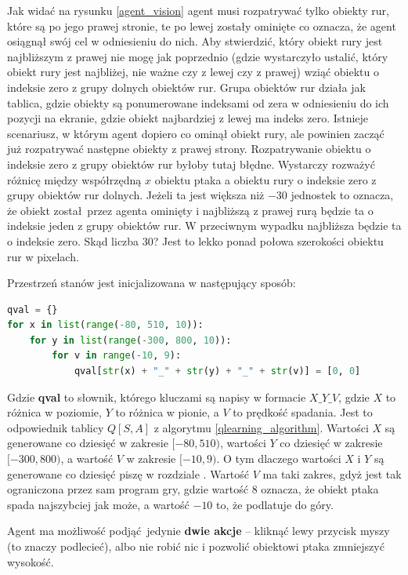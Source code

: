 \documentclass[a4paper, 12pt,oneside]{book}
\begin{document}
Jak widać na rysunku \ref{agent_vision} agent musi rozpatrywać tylko obiekty
rur, które są po jego prawej stronie, te po lewej zostały ominięte co oznacza,
że agent osiągnął swój cel w odniesieniu do nich. Aby stwierdzić, który obiekt
rury jest najbliższym z prawej nie mogę jak poprzednio (gdzie wystarczyło
ustalić, który obiekt rury jest najbliżej, nie ważne czy z lewej czy z prawej)
wziąć obiektu o indeksie zero z grupy dolnych obiektów rur. Grupa
obiektów rur działa jak tablica, gdzie obiekty są ponumerowane indeksami od
zera w odniesieniu do ich pozycji na ekranie, gdzie obiekt najbardziej z lewej
ma indeks zero. Istnieje scenariusz, w którym agent dopiero co ominął obiekt
rury, ale powinien zacząć już rozpatrywać następne obiekty z prawej strony.
Rozpatrywanie obiektu o indeksie zero z grupy obiektów rur byłoby tutaj błędne.
Wystarczy rozważyć różnicę między współrzędną $x$ obiektu ptaka a obiektu rury
o indeksie zero z grupy obiektów rur dolnych. Jeżeli ta jest większa niż $-30$
jednostek to oznacza, że obiekt został przez agenta ominięty i najbliższą z
prawej rurą będzie ta o indeksie jeden z grupy obiektów rur. W przeciwnym
wypadku najbliższa będzie ta o indeksie zero. Skąd liczba $30$? Jest to lekko
ponad połowa szerokości obiektu rur w pixelach.

Przestrzeń stanów jest inicjalizowana w następujący sposób:
\begin{lstlisting}[language=Python, label={qval_init}, caption={Inicjalizacja
Q-Values}, captionpos=t]
qval = {}
for x in list(range(-80, 510, 10)):
    for y in list(range(-300, 800, 10)):
        for v in range(-10, 9):
            qval[str(x) + "_" + str(y) + "_" + str(v)] = [0, 0]
\end{lstlisting}
Gdzie \textbf{qval} to słownik, którego kluczami są napisy w formacie
$X\_Y\_V$, gdzie $X$ to różnica w poziomie, $Y$ to różnica w pionie, a $V$ to
prędkość spadania. Jest to odpowiednik tablicy $Q[S,A]$ z algorytmu
\ref{qlearning_algorithm}. Wartości $X$ są generowane co dziesięć w zakresie
$[-80,510)$, wartości $Y$ co dziesięć w zakresie $[-300,800)$, a wartość $V$ w
zakresie $[-10,9)$. O tym dlaczego wartości $X$ i $Y$ są generowane co dziesięć
piszę w rozdziale . Wartość $V$ ma taki zakres, gdyż
jest tak ograniczona przez sam program gry, gdzie wartość $8$ oznacza, że
obiekt ptaka spada najszybciej jak może, a wartość $-10$ to, że podlatuje do
góry.

Agent ma możliwość podjąć jedynie \textbf{dwie akcje} -- kliknąć lewy przycisk
myszy (to znaczy podlecieć), albo nie robić nic i pozwolić obiektowi ptaka
zmniejszyć wysokość.
\end{document}

